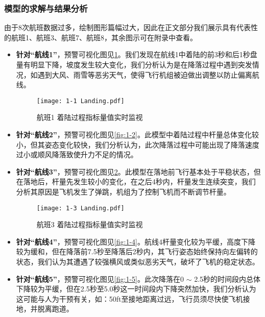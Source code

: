 \documentclass{MathorCupModeling}
\begin{document}
	\subsubsection{模型的求解与结果分析}\label{问题二结果}
	由于8次航班数据过多，绘制图形篇幅过大，因此在正文部分我们展示具有代表性的航班1、航班3、航班7、航班8，其余图示可在附录中查看。
	\begin{itemize}
		\item \textbf{针对“航线1”}，预警可视化图见\textcolor{blue}{\cref{fig:1-1}}。我们发现在航线1中着陆的前3秒和后1秒盘量有明显下降，坡度发生较大变化，我们分析认为是在降落过程中遇到突发情况，如遇到大风、雨雪等恶劣天气，使得飞行机组被迫做出调整以防止偏离航线。
		\begin{figure}[H]
			\centering
			\texttt{[image: 1-1 Landing.pdf]}
			\caption{航班1 着陆过程指标量值实时监视}
			\label{fig:1-1}
		\end{figure}
		\item \textbf{针对“航线2”}，预警可视化图见\textcolor{blue}{\cref{fig:1-2}}。此模型中着陆过程中杆量总体变化较小，但其姿态变化较快，我们分析认为，此次降落过程中可能出现了降落速度过小或顺风降落致使升力不足的情况。

		\item \textbf{针对“航线3”}，预警可视化图见\textcolor{blue}{\cref{fig:1-3}}。此模型在落地前飞行基本处于平稳状态，但在落地后，杆量先发生较小的变化，在之后4秒内，杆量发生连续突变，我们分析其原因是飞机发生了弹跳，机组为了控制飞机而不断调节杆量。
		\begin{figure}[H]
			\centering
			\texttt{[image: 1-3 Landing.pdf]}
			\caption{航班3 着陆过程指标量值实时监视}
			\label{fig:1-3}
		\end{figure}
		\item \textbf{针对“航线4”}，预警可视化图见\textcolor{blue}{\cref{fig:1-4}}。航线4杆量变化较为平缓，高度下降较为缓和，但在降落前7.5秒至降落后2秒内，其飞行姿态始终保持向左偏转的状态，我们认为其遭遇了较强横风或类似恶劣天气，破坏了飞机的稳定状态。

		\item \textbf{针对“航线5”}，预警可视化图见\textcolor{blue}{\cref{fig:1-5}}。此次降落在0 $\sim$ 2.5秒的时间段内总体下降较为平缓，但在2.5秒至5.0秒这一时间段内下降突然加快，我们分析认为这可能与人为干预有关，如：50ft至接地距离过远，飞行员须尽快使飞机接地，并脱离跑道。


\end{itemize}
\end{document}
